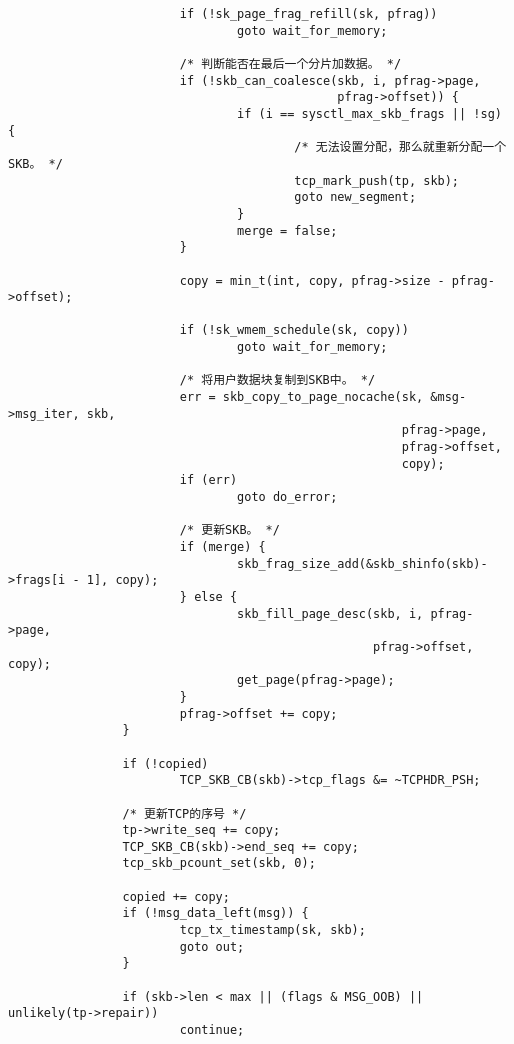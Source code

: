 \begin{verbatim}
                        if (!sk_page_frag_refill(sk, pfrag))
                                goto wait_for_memory;

                        /* 判断能否在最后一个分片加数据。 */
                        if (!skb_can_coalesce(skb, i, pfrag->page,
                                              pfrag->offset)) {
                                if (i == sysctl_max_skb_frags || !sg) {
                                        /* 无法设置分配，那么就重新分配一个SKB。 */
                                        tcp_mark_push(tp, skb);
                                        goto new_segment;
                                }
                                merge = false;
                        }

                        copy = min_t(int, copy, pfrag->size - pfrag->offset);

                        if (!sk_wmem_schedule(sk, copy))
                                goto wait_for_memory;

                        /* 将用户数据块复制到SKB中。 */
                        err = skb_copy_to_page_nocache(sk, &msg->msg_iter, skb,
                                                       pfrag->page,
                                                       pfrag->offset,
                                                       copy);
                        if (err)
                                goto do_error;

                        /* 更新SKB。 */
                        if (merge) {
                                skb_frag_size_add(&skb_shinfo(skb)->frags[i - 1], copy);
                        } else {
                                skb_fill_page_desc(skb, i, pfrag->page,
                                                   pfrag->offset, copy);
                                get_page(pfrag->page);
                        }
                        pfrag->offset += copy;
                }

                if (!copied)
                        TCP_SKB_CB(skb)->tcp_flags &= ~TCPHDR_PSH;

                /* 更新TCP的序号 */
                tp->write_seq += copy;
                TCP_SKB_CB(skb)->end_seq += copy;
                tcp_skb_pcount_set(skb, 0);

                copied += copy;
                if (!msg_data_left(msg)) {
                        tcp_tx_timestamp(sk, skb);
                        goto out;
                }

                if (skb->len < max || (flags & MSG_OOB) || unlikely(tp->repair))
                        continue;


\end{verbatim}
